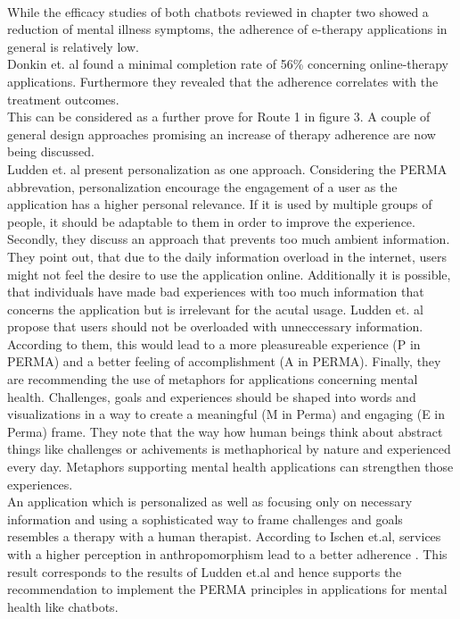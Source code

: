 \documentclass[sigconf, nonacm]{acmart}
\begin{document}
\\
While the efficacy studies of both chatbots reviewed in chapter two showed a reduction of mental illness symptoms, the adherence of e-therapy applications in general is relatively low.
\\
Donkin et. al found a minimal completion rate of 56\% concerning online-therapy applications. Furthermore they revealed that the adherence correlates with the treatment outcomes.\cite{Donkina}
\\This can be considered as a further prove for Route 1 in figure 3.  
A couple of general design approaches promising an increase of therapy adherence are now being discussed.
\\
Ludden et. al present personalization as one approach. Considering the PERMA abbrevation, personalization encourage the engagement of a user as the application has a higher personal relevance. If it is used by multiple groups of people, it should be adaptable to them in order to improve the experience.
Secondly, they discuss an approach that prevents too much ambient information. They point out, that due to the daily information overload in the internet, users might not feel the desire to use the
application online. Additionally it is possible, that individuals have made bad experiences with too much information that concerns the application but is irrelevant for the acutal usage. 
Ludden et. al propose that users should not be overloaded with unneccessary information. According to them, this would lead to a more pleasureable experience (P in PERMA) and a better feeling of accomplishment (A in PERMA).
Finally, they are recommending the use of metaphors for applications concerning mental health. Challenges, goals and experiences should be shaped into words and visualizations in a way to create a meaningful (M in Perma) and engaging (E in Perma) frame.
They note that the way how human beings think about abstract things like challenges or achivements is methaphorical by nature and experienced every day. Metaphors supporting mental health applications can strengthen those experiences.\cite{Ludden2015}
\\
An application which is personalized as well as focusing only on necessary information and using a sophisticated way to frame challenges and goals resembles a therapy with a human therapist.
According to Ischen et.al, services with a higher perception in anthropomorphism lead to a better adherence \cite{Ischen}.
This result corresponds to the results of Ludden et.al and hence supports the recommendation to implement the PERMA principles in applications for mental health like chatbots. 
\\
\end{document}
